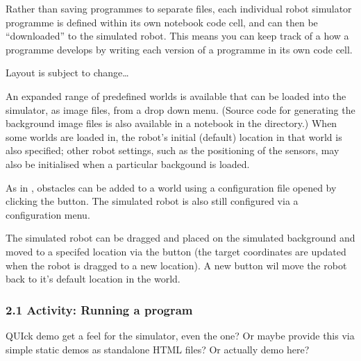 \documentclass[letterpaper,10pt,english]{sphinxmanual}
\let\sphinxpxdimen\pdfpxdimen\else\newdimen\sphinxpxdimen
\begin{document}
Rather than saving programmes to separate files, each individual robot simulator programme is defined within its own notebook code cell, and can then be “downloaded” to the simulated robot. This means you can keep track of a how a programme develops by writing each version of a programme in its own code cell.



Layout is subject to change…



\sphinxincludegraphics[width=2518\sphinxpxdimen,height=1592\sphinxpxdimen]{{nbev3devsim_overview}.png}

An expanded range of predefined worlds is available that can be loaded into the simulator, as image files, from a drop down menu. (Source code for generating the background image files is also available in a notebook in the  directory.) When some worlds are loaded in, the robot’s initial (default) location in that world is also specified; other robot settings, such as the positioning of the sensors, may also be initialised when a particular backgound is loaded.

As in , obstacles can be added to a world using a configuration file opened by clicking the  button. The simulated robot is also still configured via a configuration menu.

The simulated robot can be dragged and placed on the simulated background and moved to a specifed location via the  button (the target co\sphinxhyphen{}ordinates are updated when the robot is dragged to a new location). A new  button wil move the robot back to it’s default location in the world.



\subsubsection{2.1 Activity: Running a program}
\label{\detokenize{content/00_SOFTWARE_GUIDE/Section_00_02-nb3devsim:2.1-Activity:-Running-a-program}}
QUIck demo \sphinxhyphen{} get a feel for the simulator, even the  one? Or maybe provide this via simple static demos as standalone HTML files? Or actually demo  here?
\end{document}
